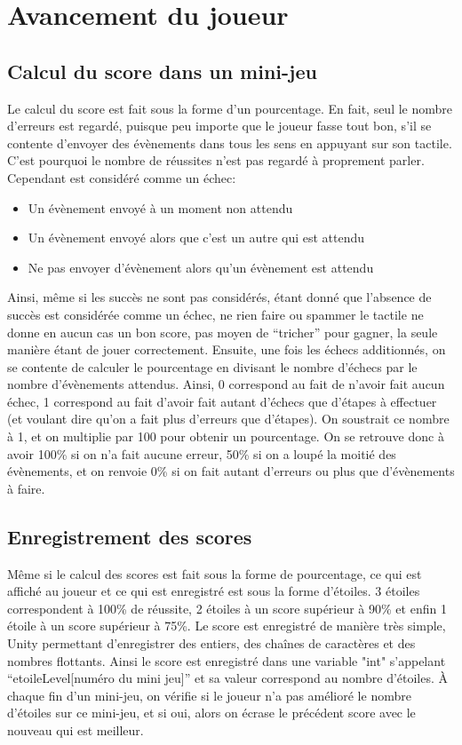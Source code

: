 \section{Avancement du joueur}

\subsection{Calcul du score dans un mini-jeu}

Le calcul du score est fait sous la forme d'un pourcentage. En fait, seul le nombre d'erreurs est regardé, puisque peu importe que le joueur fasse tout bon, s’il se contente d'envoyer des évènements dans tous les sens en appuyant sur son tactile. C'est pourquoi le nombre de réussites n'est pas regardé à proprement parler. Cependant est considéré comme un échec:
\begin{itemize}
\item Un évènement envoyé à un moment non attendu
\item Un évènement envoyé alors que c'est un autre qui est attendu
\item Ne pas envoyer d'évènement alors qu'un évènement est attendu
\end{itemize}
Ainsi, même si les succès ne sont pas considérés, étant donné que l'absence de succès est considérée comme un échec, ne rien faire ou spammer le tactile ne donne en aucun cas un bon score, pas moyen de “tricher” pour gagner, la seule manière étant de jouer correctement.
Ensuite, une fois les échecs additionnés, on se contente de calculer le pourcentage en divisant le nombre d'échecs par le nombre d'évènements attendus. Ainsi, 0 correspond au fait de n'avoir fait aucun échec, 1 correspond au fait d'avoir fait autant d'échecs que d'étapes à effectuer (et voulant dire qu'on a fait plus d'erreurs que d'étapes). On soustrait ce nombre à 1, et on multiplie par 100 pour obtenir un pourcentage. On se retrouve donc à avoir 100\% si on n'a fait aucune erreur, 50\% si on a loupé la moitié des évènements, et on renvoie 0\% si on fait autant d'erreurs ou plus que d'évènements à faire. 

\subsection{Enregistrement des scores}

Même si le calcul des scores est fait sous la forme de pourcentage, ce qui est affiché au joueur et ce qui est enregistré est sous la forme d'étoiles. 3 étoiles correspondent à 100\% de réussite, 2 étoiles à un score supérieur à 90\% et enfin 1 étoile à un score supérieur à 75\%. Le score est enregistré de manière très simple, Unity permettant d'enregistrer des entiers, des chaînes de caractères et des nombres flottants. Ainsi le score est enregistré dans une variable "int" s'appelant “etoileLevel[numéro du mini jeu]” et sa valeur correspond au nombre d'étoiles. À chaque fin d'un mini-jeu, on vérifie si le joueur n'a pas amélioré le nombre d'étoiles sur ce mini-jeu, et si oui, alors on écrase le précédent score avec le nouveau qui est meilleur.

